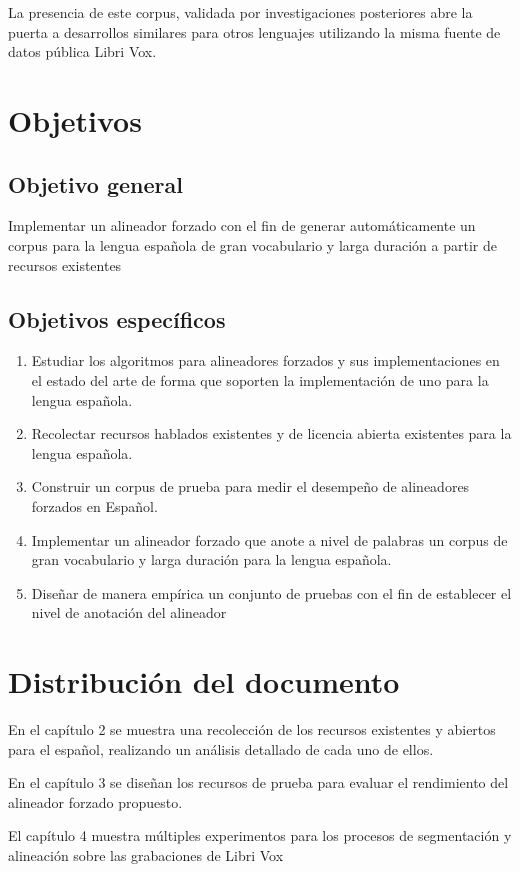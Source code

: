La presencia de este corpus, validada por investigaciones posteriores abre la puerta a desarrollos similares para otros lenguajes utilizando la misma fuente de datos pública Libri Vox. 



\section{Objetivos}


\subsection{Objetivo general}

Implementar un alineador forzado con el fin de generar automáticamente un corpus para la lengua española de gran vocabulario y larga duración a partir de recursos existentes

\subsection{Objetivos específicos}

\begin{enumerate}
    \item Estudiar los algoritmos para alineadores forzados y sus implementaciones en el estado del arte de forma que soporten la implementación de uno para la lengua española.
    \item Recolectar recursos hablados existentes y de licencia abierta existentes para la lengua española.
    \item Construir un corpus de prueba para medir el desempeño de alineadores forzados en Español.
    \item Implementar un alineador forzado que anote a nivel de palabras un corpus de gran vocabulario y larga duración para la lengua española.
    \item Diseñar de manera empírica un conjunto de pruebas con el fin de establecer el nivel de anotación del alineador

\end{enumerate}

\section{Distribución del documento}

En el capítulo 2 se muestra una recolección de los recursos existentes y abiertos para el español, realizando un análisis detallado de cada uno de ellos.

En el capítulo 3 se diseñan los recursos de prueba para evaluar el rendimiento del alineador forzado propuesto.

El capítulo 4 muestra múltiples experimentos para los procesos de segmentación y alineación sobre las grabaciones de Libri Vox
